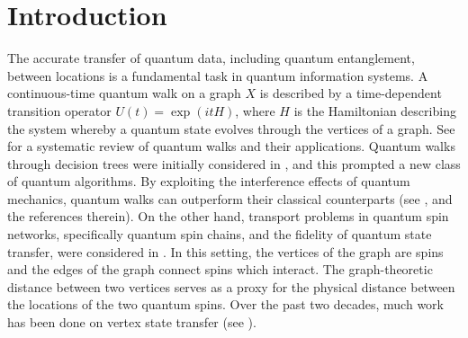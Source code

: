 \documentclass{article}
\numberwithin{equation}{section}
\begin{document}
\addtocounter{footnote}{1}
\addtocounter{footnote}{1}
\addtocounter{footnote}{1}

{\def\thefootnote{}

\section{Introduction}
The accurate transfer of quantum data, including quantum entanglement, between locations is a fundamental task in quantum information systems. 
A continuous-time quantum walk on a graph $X$ is described by a time-dependent transition operator $U(t)=\exp(itH)$, where $H$ is the  Hamiltonian describing the system whereby a 
quantum state evolves through the vertices of a graph. See \cite{kadian2021quantum} for a systematic review of quantum walks and their applications. Quantum walks through decision trees were initially considered in \cite{Farhi1998}, and this prompted a new class of quantum algorithms. By exploiting the interference
effects of quantum mechanics,  quantum walks can  outperform their classical counterparts (see \cite{childs2003, childs2007, childs2009},  and the references therein). On the other hand, transport
problems in quantum spin networks, specifically quantum spin chains, and the
fidelity of quantum state transfer, were considered in \cite{Bose:Quantum}. In this setting, the vertices of the graph are spins and the edges of the graph connect
spins which interact. The graph-theoretic distance between two vertices serves as a proxy for the physical distance between the locations of the two quantum spins. Over the past two decades, much work has been done on vertex state transfer (see \cite{christandl2004, christandl2005, godsil2012can, godsil2012state, kay2010perfect}). 

}
\end{document}
